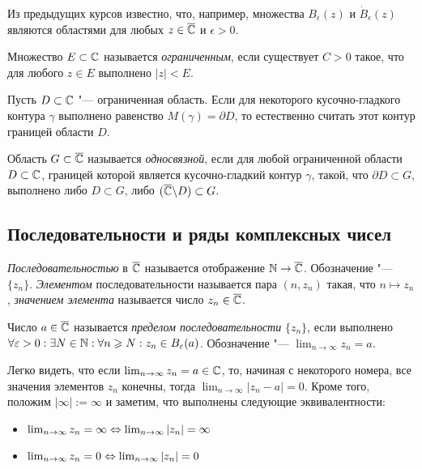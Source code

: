 \begin{note}
	Из предыдущих курсов известно, что, например, множества $B_\epsilon(z)$ и $\dot B_\epsilon(z)$ являются областями для любых $z \in \overline{\mathbb{C}}$ и $\epsilon > 0$.
\end{note}

\begin{definition}
	Множество $E \subset \mathbb{C}$ называется \textit{ограниченным}, если существует $C > 0$ такое, что для любого $z \in E$ выполнено $|z| < E$.
\end{definition}

\begin{note}
	Пусть $D \subset \mathbb{C}$ "--- ограниченная область. Если для некоторого кусочно-гладкого контура $\gamma$ выполнено равенство $M(\gamma) = \partial D$, то естественно считать этот контур границей области $D$.
\end{note}
\pagebreak

\begin{definition}
	Область $G \subset \overline{\mathbb{C}}$ называется \textit{односвязной}, если для любой ограниченной области $D \subset \mathbb{C}$, границей которой является кусочно-гладкий контур $\gamma$, такой, что $\partial D \subset G$, выполнено либо $D \subset G$, либо $(\overline{\mathbb{C}} \backslash D) \subset G$.
\end{definition}

\subsection{Последовательности и ряды комплексных чисел}

\begin{definition}
	\textit{Последовательностью} в $\overline{\mathbb{C}}$ называется отображение $\mathbb{N} \to \overline{\mathbb{C}}$. Обозначение "--- $\{z_n\}$. \textit{Элементом} последовательности называется пара $(n, z_n)$ такая, что $n \mapsto z_n$, \textit{значением элемента} называется число $z_n \in \overline{\mathbb{C}}$.
\end{definition}

\begin{definition}
	Число $a \in \overline{\mathbb{C}}$ называется \textit{пределом последовательности} $\{z_n\}$, если выполнено $\forall \varepsilon > 0 : \exists N \in \mathbb{N}: \forall n \geqslant N: z_n \in B_{\varepsilon}(a)$. Обозначение "--- $\lim_{n \to \infty}z_n = a$.
\end{definition}

\begin{note}
	Легко видеть, что если $\lim_{n \to \infty}z_n = a \in \mathbb{C}$, то, начиная с некоторого номера, все значения элементов $z_n$ конечны, тогда $\lim_{n \to \infty}|z_n - a| = 0$. Кроме того, положим $|\infty| := \infty$ и заметим, что выполнены следующие эквивалентности:
	\begin{itemize}
		\item $\lim_{n \to \infty}z_n = \infty \Leftrightarrow \lim_{n \to \infty}|z_n| = \infty$
		\item $\lim_{n \to \infty}z_n = 0 \Leftrightarrow \lim_{n \to \infty}|z_n| = 0$
	\end{itemize}
\end{note}


